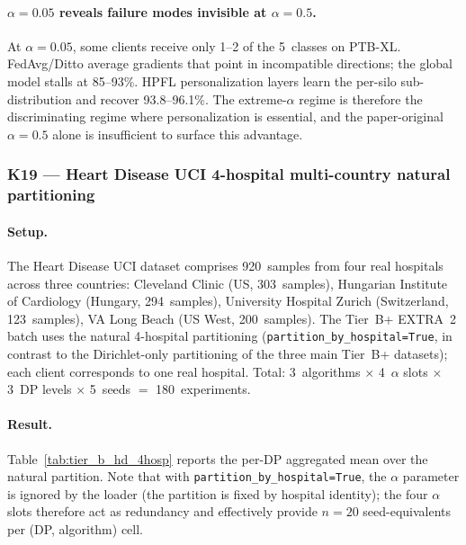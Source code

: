 \documentclass[conference]{IEEEtran}
\begin{document}
\paragraph{$\alpha{=}0.05$ reveals failure modes invisible at $\alpha{=}0.5$.} At $\alpha{=}0.05$, some clients receive only 1--2 of the 5~classes on PTB-XL. FedAvg/Ditto average gradients that point in incompatible directions; the global model stalls at 85--93\%. HPFL personalization layers learn the per-silo sub-distribution and recover 93.8--96.1\%. The extreme-$\alpha$ regime is therefore the discriminating regime where personalization is essential, and the paper-original $\alpha{=}0.5$ alone is insufficient to surface this advantage.

\subsubsection*{K19 --- Heart Disease UCI 4-hospital multi-country natural partitioning}

\paragraph{Setup.} The Heart Disease UCI dataset comprises 920~samples from four real hospitals across three countries: Cleveland Clinic (US, 303~samples), Hungarian Institute of Cardiology (Hungary, 294~samples), University Hospital Zurich (Switzerland, 123~samples), VA Long Beach (US West, 200~samples). The Tier~B+ EXTRA~2 batch uses the natural 4-hospital partitioning (\texttt{partition\_by\_hospital{=}True}, in contrast to the Dirichlet-only partitioning of the three main Tier~B+ datasets); each client corresponds to one real hospital. Total: 3~algorithms $\times$ 4~$\alpha$ slots $\times$ 3~DP levels $\times$ 5~seeds $=$ 180~experiments.

\paragraph{Result.} Table~\ref{tab:tier_b_hd_4hosp} reports the per-DP aggregated mean over the natural partition. Note that with \texttt{partition\_by\_hospital{=}True}, the $\alpha$ parameter is ignored by the loader (the partition is fixed by hospital identity); the four $\alpha$ slots therefore act as redundancy and effectively provide $n{=}20$ seed-equivalents per (DP, algorithm) cell.
\end{document}
